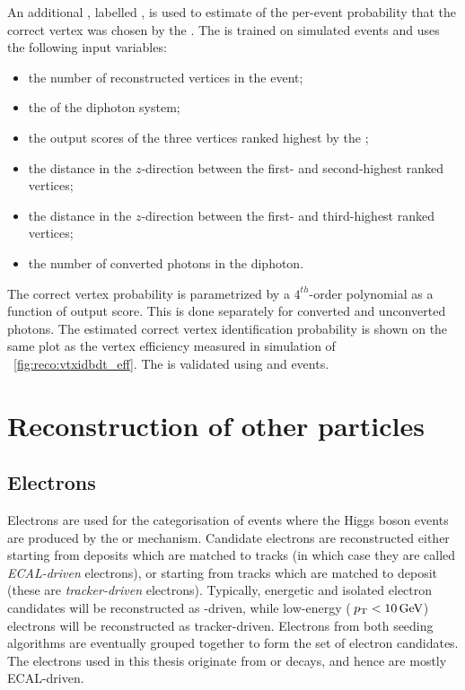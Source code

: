 An additional \BDT, labelled \VtxProbBdt, is used to estimate of the per-event probability that the correct vertex was chosen by the \VtxProbBdt. The \VtxProbBdt is trained on simulated \Hgg events and uses the following input variables: 

\begin{itemize}
\item the number of reconstructed vertices in the event;
\item the \pT of the diphoton system;
\item the output scores of the three vertices ranked highest by the \VtxIdBdt;
\item the distance in the $z$-direction between the first- and second-highest ranked vertices;
\item the distance in the $z$-direction between the first- and third-highest ranked vertices;
\item the number of converted photons in the diphoton. 
\end{itemize}

The correct vertex probability is parametrized by a $4^{th}$-order polynomial as a function of \VtxIdBdt output score. This is done separately for converted and unconverted photons. The estimated correct vertex identification probability is shown on the same plot as the vertex efficiency measured in simulation of \Fig~\ref{fig:reco:vtxidbdt_eff}. The \VtxProbBdt is validated using \Zmumu and \gammaJet events. 

\section{Reconstruction of other particles} 
\label{reco:sec:other}
\subsection{Electrons}

Electrons are used for the categorisation of \Hgg events where the Higgs boson events are produced by the \ZH or \WH mechanism. Candidate \PF electrons are reconstructed either starting from \ECAL deposits which are matched to tracks (in which case they are called \emph{ECAL-driven} electrons), or starting from tracks which are matched to \ECAL deposit (these are \emph{tracker-driven} electrons). Typically, energetic and isolated electron candidates will be reconstructed as \ECAL-driven, while low-energy ($\,p_\text{T}<10\,\text{Ge\hspace{-.08em}V}$) electrons will be reconstructed as tracker-driven. Electrons from both seeding algorithms are eventually grouped together to form the set of \PF electron candidates. The electrons used in this thesis originate from \PWpm or \PZ decays, and hence are mostly ECAL-driven.


